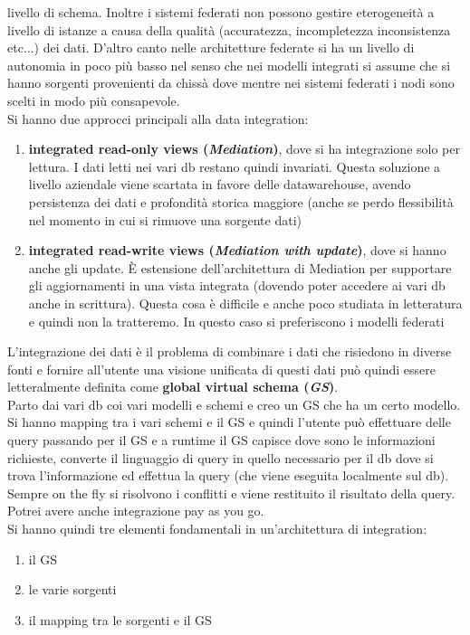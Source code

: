 \documentclass[a4paper,12pt, oneside]{book}
\begin{document}
livello di schema. Inoltre i sistemi federati non possono gestire eterogeneità a
livello di istanze a causa della qualità (accuratezza, incompletezza
inconsistenza etc$\ldots$) dei dati. D'altro canto nelle architetture federate si
ha un livello di autonomia in poco più basso nel senso che nei modelli integrati
si assume che si hanno sorgenti provenienti da chissà dove mentre nei sistemi
federati i nodi sono scelti in modo più consapevole.\\
Si hanno due approcci principali alla data integration:
\begin{enumerate}
  \item \textbf{integrated read-only views (\textit{Mediation})}, dove si ha
  integrazione solo per lettura. I dati letti nei vari db restano quindi
  invariati. Questa soluzione a livello aziendale viene scartata in favore delle
  datawarehouse, avendo persistenza dei dati e profondità storica maggiore
  (anche se perdo flessibilità nel momento in cui si rimuove una sorgente dati)
  \item \textbf{integrated read-write views (\textit{Mediation with update})},
  dove si hanno anche gli update. È estensione dell'architettura di Mediation
  per supportare gli aggiornamenti in una vista integrata (dovendo poter
  accedere ai vari db anche in scrittura). Questa cosa è
  difficile e anche poco studiata in letteratura e quindi non la tratteremo. In
  questo caso si preferiscono i modelli federati
\end{enumerate}
L'integrazione dei dati è il problema di combinare i dati che risiedono in
diverse fonti e fornire all'utente una visione unificata di questi dati può
quindi essere letteralmente definita come \textbf{global virtual schema
  (\textit{GS})}.\\
Parto dai vari db coi vari modelli e schemi e creo un GS che ha un certo
modello. Si hanno mapping tra i vari schemi e il GS e quindi l'utente può
effettuare delle query passando per il GS e a runtime il GS capisce dove sono le
informazioni richieste, converte il linguaggio di query in quello necessario per
il db dove si trova l'informazione ed effettua la query (che viene eseguita
localmente sul db). Sempre on the fly si risolvono i conflitti e viene
restituito il risultato della query. Potrei avere anche integrazione pay as you
go.\\
Si hanno quindi tre elementi fondamentali in un'architettura di integration:
\begin{enumerate}
  \item il GS
  \item le varie sorgenti
  \item il mapping tra le sorgenti e il GS
\end{enumerate}
\end{document}
